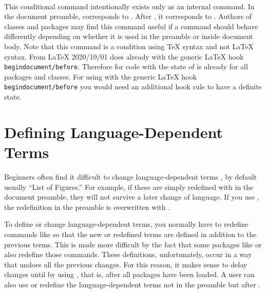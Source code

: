 \begin{Declaration}
  \ \ %
  \ \ 
\end{Declaration}
This conditional command intentionally exists only as an internal command. In
the document preamble,  corresponds to .
After , it corresponds to .
Authors of classes and packages may find this command useful if a command
should behave differently depending on whether it is used in the preamble or
inside document body. Note that this command is a
condition using \TeX{} syntax and not \LaTeX{}
syntax. From \LaTeX{} 2020/10/01
 does  already with the generic
\LaTeX{} hook \texttt{begindocument/before}. Therefore for code with
 the state of  is already
 for all packages and classes. For using 
with the generic \LaTeX{} hook \texttt{begindocument/before} you would need an
additional hook rule to have a definite state.%
\EndIndexGroup


\section{Defining Language-Dependent Terms}
\BeginIndexGroup
{}

Beginners often find it difficult to change language-dependent terms
, by default usually ``List of
Figures.'' For example, if these are simply redefined with
 in the document preamble, they will not survive a later
change of language. If you use , the
redefinition in the preamble is overwritten with
.

To define or change language-dependent terms, you normally have to redefine
commands like  so that the new or redefined terms are
defined in addition to the previous terms. This is made more difficult by the
fact that some packages like  or
 also redefine those
commands. These definitions, unfortunately, occur in a way that undoes all the
previous changes. For this reason, it makes sense to delay changes until
 by using , that is,
after all packages have been loaded. A user can also use
 or redefine the language-dependent terms not in the
preamble but after .

